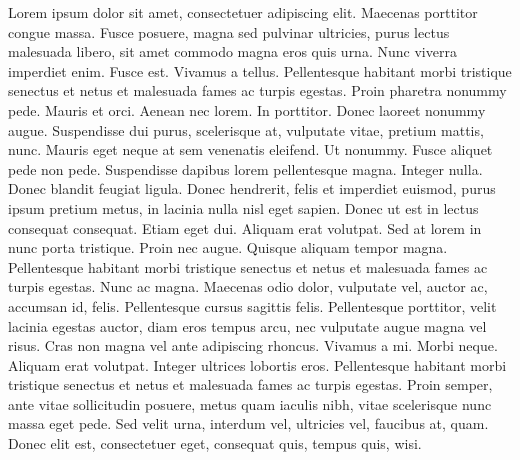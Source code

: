 \documentclass{biorxiv}
\begin{document}
\begin{methods}
Lorem ipsum dolor sit amet, consectetuer adipiscing elit. Maecenas porttitor
congue massa. Fusce posuere, magna sed pulvinar ultricies, purus lectus
malesuada libero, sit amet commodo magna eros quis urna. Nunc viverra
imperdiet enim. Fusce est. Vivamus a tellus. Pellentesque habitant morbi
tristique senectus et netus et malesuada fames ac turpis egestas. Proin
pharetra nonummy pede. Mauris et orci. Aenean nec lorem. In porttitor. Donec
laoreet nonummy augue. Suspendisse dui purus, scelerisque at, vulputate vitae,
pretium mattis, nunc. Mauris eget neque at sem venenatis eleifend. Ut nonummy.
Fusce aliquet pede non pede. Suspendisse dapibus lorem pellentesque magna.
Integer nulla. Donec blandit feugiat ligula. Donec hendrerit, felis et
imperdiet euismod, purus ipsum pretium metus, in lacinia nulla nisl eget
sapien. Donec ut est in lectus consequat consequat. Etiam eget dui. Aliquam
erat volutpat. Sed at lorem in nunc porta tristique. Proin nec augue. Quisque
aliquam tempor magna. Pellentesque habitant morbi tristique senectus et netus
et malesuada fames ac turpis egestas. Nunc ac magna. Maecenas odio dolor,
vulputate vel, auctor ac, accumsan id, felis. Pellentesque cursus sagittis
felis. Pellentesque porttitor, velit lacinia egestas auctor, diam eros tempus
arcu, nec vulputate augue magna vel risus. Cras non magna vel ante adipiscing
rhoncus. Vivamus a mi. Morbi neque. Aliquam erat volutpat. Integer ultrices
lobortis eros. Pellentesque habitant morbi tristique senectus et netus et
malesuada fames ac turpis egestas. Proin semper, ante vitae sollicitudin
posuere, metus quam iaculis nibh, vitae scelerisque nunc massa eget pede. Sed
velit urna, interdum vel, ultricies vel, faucibus at, quam. Donec elit est,
consectetuer eget, consequat quis, tempus quis, wisi.

\end{methods}

\supplementary
\end{document}
